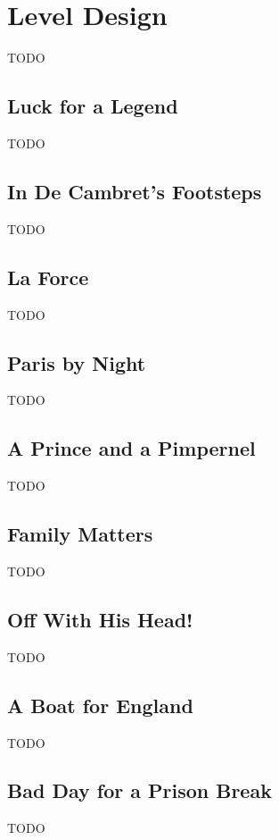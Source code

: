 \chapter{Level Design}

TODO

\section{Luck for a Legend}


TODO

\section{In De Cambret's Footsteps}

TODO

\section{La Force}

TODO

\section{Paris by Night}

TODO

\section{A Prince and a Pimpernel}

TODO

\section{Family Matters}

TODO

\section{Off With His Head!}

TODO

\section{A Boat for England}

TODO

\section{Bad Day for a Prison Break}

TODO
